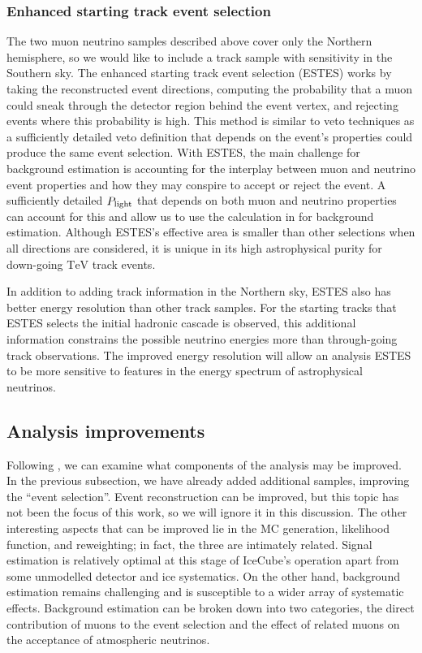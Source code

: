 \subsubsection{Enhanced starting track event selection}
The two muon neutrino samples described above cover only the Northern hemisphere, so we would like to include a track sample with sensitivity in the Southern sky.
The enhanced starting track event selection (ESTES) works by taking the reconstructed event directions, computing the probability that a muon could sneak through the detector region behind the event vertex, and rejecting events where this probability is high.
This method is similar to veto techniques as a sufficiently detailed veto definition that depends on the event's properties could produce the same event selection.
With ESTES, the main challenge for background estimation is accounting for the interplay between muon and neutrino event properties and how they may conspire to accept or reject the event.
A sufficiently detailed $P_{\rm light}$ that depends on both muon and neutrino properties can account for this and allow us to use the calculation in  for background estimation.
Although ESTES's effective area is smaller than other selections when all directions are considered, it is unique in its high astrophysical purity for down-going $\si\TeV$ track events.

In addition to adding track information in the Northern sky, ESTES also has better energy resolution than other track samples.
For the starting tracks that ESTES selects the initial hadronic cascade is observed, this additional information constrains the possible neutrino energies more than through-going track observations.
The improved energy resolution will allow an analysis ESTES to be more sensitive to features in the energy spectrum of astrophysical neutrinos.

\subsection{Analysis improvements}
Following , we can examine what components of the analysis may be improved.
In the previous subsection, we have already added additional samples, improving the ``event selection''.
Event reconstruction can be improved, but this topic has not been the focus of this work, so we will ignore it in this discussion.
The other interesting aspects that can be improved lie in the MC generation, likelihood function, and reweighting; in fact, the three are intimately related.
Signal estimation is relatively optimal at this stage of IceCube's operation apart from some unmodelled detector and ice systematics.
On the other hand, background estimation remains challenging and is susceptible to a wider array of systematic effects.
Background estimation can be broken down into two categories, the direct contribution of muons to the event selection and the effect of related muons on the acceptance of atmospheric neutrinos.

